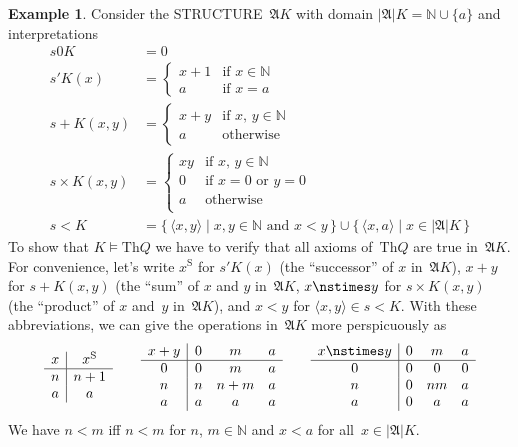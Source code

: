 \documentclass[10pt,a4paper]{article}
\newcommand*{\olup}[1]{\MakeUppercase{#1}}
\theoremstyle{plain}
\theoremstyle{definition}
\newtheorem{ex}[thm]{Example}
\theoremstyle{remark}
\newcommand*{\ollabel}[1]{\label{#1}}
\providecommand{\Obj}{}
\providecommand{\Struct}{\ensuremath{\mathfrak{A}}}
\providecommand{\Domain}{\ensuremath{|\mathfrak{A}|}}
\providecommand{\Assign}{\ensuremath{s}}
\providecommand{\Sat}[2]{\ensuremath{#1 \models #2}}
\providecommand{\Th}{\ensuremath{\mathrm{Th}}}
\providecommand{\tuple}[1]{\langle #1 \rangle}
\providecommand{\Nat}{\ensuremath{\mathbb{N}}}
\providecommand{\Setabs}[2]{\{\, #1 \mid #2 \,\}}
\providecommand{\nssucc}{\mathrm{S}}
\providecommand{\nsplus}{\mathbin{+}}
\providecommand{\nsless}{<}
\begin{document}
\begin{ex}
\ollabel{ex:model-K-of-Q}
Consider the \olup{structure}~$\Struct{K}$ with domain $\Domain{K} = \Nat
\cup \{a\}$ and interpretations
\begin{align*}
  \Assign{\Obj{0}}{K} & = 0\\
  \Assign{\prime}{K}(x) & =
  \begin{cases}
    x+1 & \text{if $x\in \Nat$}\\
    a & \text{if $x = a$}
  \end{cases}\\
  \Assign{+}{K}(x, y) & =
  \begin{cases}
    x+y & \text{if $x$, $y \in\Nat$}\\
    a & \text{otherwise}
  \end{cases}\\
  \Assign{\times}{K}(x, y) & =
  \begin{cases}
    xy & \text{if $x$, $y \in\Nat$}\\
    0 & \text{if $x = 0$ or $y = 0$}\\
    a & \text{otherwise}\\
  \end{cases}\\
  \Assign{<}{K} & =
  \Setabs{\tuple{x,y}}{x, y \in \Nat \text{ and } x<y} \cup
  \Setabs{\tuple{x,a}}{x \in \Domain{K}}
\end{align*}
To show that $\Sat{K}{\Th{Q}}$ we have to verify that all axioms
of~$\Th{Q}$ are true in~$\Struct{K}$.  For convenience, let's write
$x^\nssucc$ for $\Assign{\prime}{K}(x)$ (the ``successor'' of $x$
in~$\Struct{K}$), $x \nsplus y$ for $\Assign{+}{K}(x, y)$ (the ``sum''
of $x$ and $y$ in~$\Struct{K}$, $x \nstimes y$ for
$\Assign{\times}{K}(x, y)$ (the ``product'' of $x$ and~$y$
in~$\Struct{K}$), and $x \nsless y$ for $\tuple{x,y} \in
\Assign{<}{K}$. With these abbreviations, we can give the operations
in~$\Struct{K}$ more perspicuously as
\[
\begin{array}{c|c}
  x & x^\nssucc \\
  \hline
  n & n+1 \\
  a & a
\end{array}
\qquad
\begin{array}{c|ccc}
  x \nsplus y & 0 & m & a \\
  \hline
  0 & 0 & m & a \\
  n & n & n+m & a \\
  a & a & a & a \\
\end{array}
\qquad
\begin{array}{c|ccc}
  x \nstimes y & 0 & m & a \\
  \hline
  0 & 0 & 0 & 0 \\
  n & 0 & nm & a \\
  a & 0 & a & a \\
\end{array}
\]
We have $n \nsless m$ iff $n<m$ for $n$, $m \in \Nat$ and $x \nsless
a$ for all~$x \in \Domain{K}$.


\end{ex}
\end{document}
